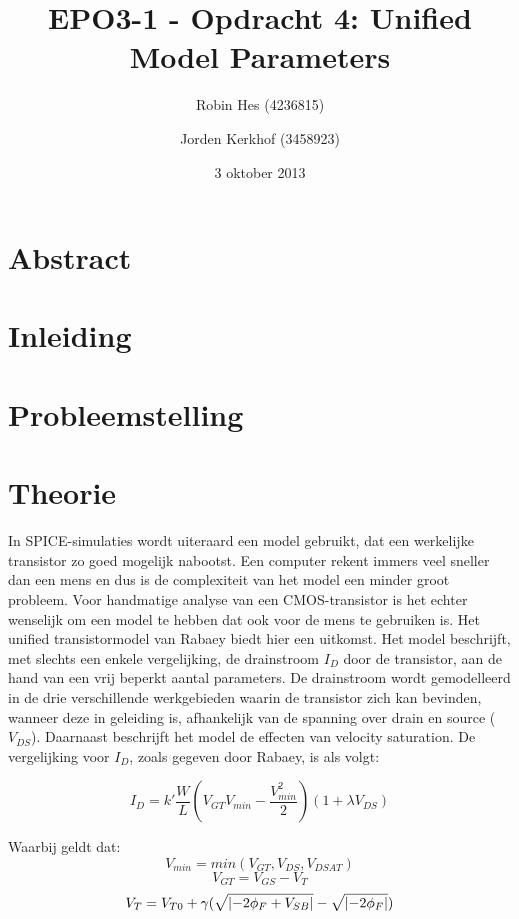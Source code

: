 \documentclass{article}
\author{Robin Hes (4236815) \and Jorden Kerkhof (3458923)}
\title{EPO3-1 - Opdracht 4: Unified Model Parameters}
\date{3 oktober 2013}
\begin{document}
\maketitle

\section{Abstract}
\label{sec:ump-abstr}

\tableofcontents

\section{Inleiding}
\label{sec:ump-inl}

\section{Probleemstelling}
\label{sec:ump-prob}

\section{Theorie}
\label{sec:ump-theorie}
In SPICE-simulaties wordt uiteraard een model gebruikt, dat een werkelijke transistor zo goed mogelijk nabootst. Een computer rekent immers veel sneller dan een mens en dus is de complexiteit van het model een minder groot probleem. Voor handmatige analyse van een CMOS-transistor is het echter wenselijk om een model te hebben dat ook voor de mens te gebruiken is.
Het unified transistormodel van Rabaey biedt hier een uitkomst. Het model beschrijft, met slechts een enkele vergelijking, de drainstroom $I_{D}$ door de transistor, aan de hand van een vrij beperkt aantal parameters. De drainstroom wordt gemodelleerd in de drie verschillende werkgebieden waarin de transistor zich kan bevinden, wanneer deze in geleiding is, afhankelijk van de spanning over drain en source ($V_{DS}$). Daarnaast beschrijft het model de effecten van velocity saturation.
De vergelijking voor $I_{D}$, zoals gegeven door Rabaey, is als volgt:

\begin{equation}
	I_{D} = k' \frac{W}{L} (V_{GT}V_{min} - \frac{V_{min}^2}{2})(1 + \lambda V_{DS})
	\label{ump-cmos-model-rab}
\end{equation}

Waarbij geldt dat: \\
$$V_{min} = min(V_{GT}, V_{DS}, V_{DSAT})$$
$$V_{GT} = V_{GS} - V_{T}$$
$$V_{T} = V_{T0} + \gamma ( \sqrt{\lvert-2\phi_{F} + V_{SB}\rvert} - \sqrt{\lvert-2\phi_{F}\rvert} )$$
\cite[101]{rabaey-integrated-circuits}\\
\end{document}
